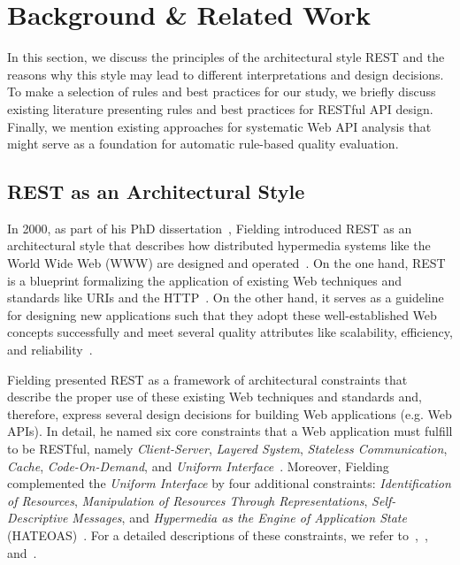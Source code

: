 \documentclass[runningheads]{llncs}
\begin{document}
\section{Background \& Related Work}
\label{sec:background}
In this section, we discuss the principles of the architectural style REST and the reasons why this style may lead to different interpretations and design decisions. To make a selection of rules and best practices for our study, we briefly discuss existing literature presenting rules and best practices for RESTful API design. Finally, we mention existing approaches for systematic Web API analysis that might serve as a foundation for automatic rule-based quality evaluation.

\subsection{REST as an Architectural Style}
In 2000, as part of his PhD dissertation~\cite{thesis:Rest2000}, Fielding introduced REST as an architectural style that describes how distributed hypermedia systems like the World Wide Web (WWW) are designed and operated~\cite{book:RestInPractice:2010}. On the one hand, REST is a blueprint formalizing the application of existing Web techniques and standards like URIs and the HTTP~\cite{book:RestInPractice:2010}. On the other hand, it serves as a guideline for designing new applications such that they adopt these well-established Web concepts successfully and meet several quality attributes like scalability, efficiency, and reliability~\cite{article:PrincipleDesignOfTheModernWebArchitecture:2002}.  

Fielding presented REST as a framework of architectural constraints that describe the proper use of these existing Web techniques and standards and, therefore, express several design decisions for building Web applications (e.g. Web APIs). In detail, he named six core constraints that a Web application must fulfill to be RESTful, namely \textit{Client-Server}, \textit{Layered System}, \textit{Stateless Communication}, \textit{Cache}, \textit{Code-On-Demand}, and \textit{Uniform Interface}~\cite{article:PrincipleDesignOfTheModernWebArchitecture:2002}. Moreover, Fielding complemented the \textit{Uniform Interface} by four additional constraints: \textit{Identification of Resources}, \textit{Manipulation of Resources Through Representations}, \textit{Self-Descriptive Messages}, and \textit{Hypermedia as the Engine of Application State} (HATEOAS)~\cite{article:PrincipleDesignOfTheModernWebArchitecture:2002}. For a detailed descriptions of these constraints, we refer to~\cite{article:PrincipleDesignOfTheModernWebArchitecture:2002},~\cite{conference:AModelDrivenApproachForRESTCompliantServices}, and~\cite{book:RestApiDesignRulebook2011}. 
\end{document}
